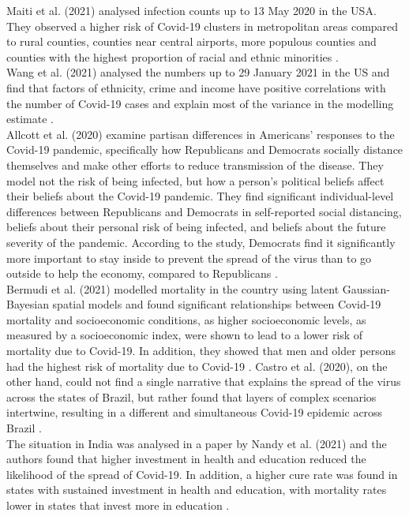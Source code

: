 Maiti et al. (2021) analysed infection counts up to 13 May 2020 in the USA. They observed a higher risk of Covid-19 clusters in metropolitan areas compared to rural counties, counties near central airports, more populous counties and counties with the highest proportion of racial and ethnic minorities \autocite[][]{maiti2021exploring}. \\
Wang et al. (2021) analysed the numbers up to 29 January 2021 in the US and find that factors of ethnicity, crime and income have positive correlations with the number of Covid-19 cases and explain most of the variance in the modelling estimate \autocite[][]{wang2021spatiotemporal}. \\
Allcott et al. (2020) examine partisan differences in Americans' responses to the Covid-19 pandemic, specifically how Republicans and Democrats socially distance themselves and make other efforts to reduce transmission of the disease. They model not the risk of being infected, but how a person's political beliefs affect their beliefs about the Covid-19 pandemic. They find significant individual-level differences between Republicans and Democrats in self-reported social distancing, beliefs about their personal risk of being infected, and beliefs about the future severity of the pandemic. According to the study, Democrats find it significantly more important to stay inside to prevent the spread of the virus than to go outside to help the economy, compared to Republicans \autocite[][]{allcott2020polarization}. \\
Bermudi et al. (2021) modelled mortality in the country using latent Gaussian-Bayesian spatial models and found significant relationships between Covid-19 mortality and socioeconomic conditions, as higher socioeconomic levels, as measured by a socioeconomic index, were shown to lead to a lower risk of mortality due to Covid-19. In addition, they showed that men and older persons had the highest risk of mortality due to Covid-19 \autocite[][]{bermudi2021spatiotemporal}. Castro et al. (2020), on the other hand, could not find a single narrative that explains the spread of the virus across the states of Brazil, but rather found that layers of complex scenarios intertwine, resulting in a different and simultaneous Covid-19 epidemic across Brazil \autocite[][]{castro2021spatiotemporal}. \\
The situation in India was analysed in a paper by Nandy et al. (2021) and the authors found that higher investment in health and education reduced the likelihood of the spread of Covid-19. In addition, a higher cure rate was found in states with sustained investment in health and education, with mortality rates lower in states that invest more in education \autocite[][]{nandy2021managing}. \\
